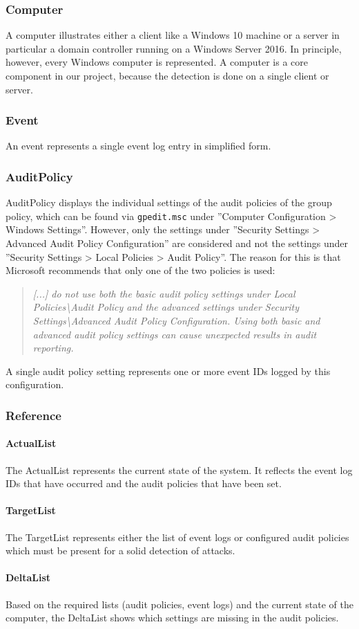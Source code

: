\subsubsection{Computer}
A computer illustrates either a client like a Windows 10 machine or a server in particular a domain controller running on a Windows Server 2016. In principle, however, every Windows computer is represented. A computer is a core component in our project, because the detection is done on a single client or server. 

\subsubsection{Event}
An event represents a single event log entry in simplified form.

\subsubsection{AuditPolicy}\label{DomainModelAuditPolicy}
AuditPolicy displays the individual settings of the audit policies of the group policy, which can be found via \lstinline|gpedit.msc| under ''Computer Configuration > Windows Settings''. However, only the settings under ''Security Settings > Advanced Audit Policy Configuration'' are considered and not the settings under ''Security Settings > Local Policies > Audit Policy''. The reason for this is that Microsoft recommends that only one of the two policies is used:
\begin{quotation}
    \textit{[...] do not use both the basic audit policy settings under Local Policies\textbackslash Audit Policy and the advanced settings under Security Settings\textbackslash Advanced Audit Policy Configuration. Using both basic and advanced audit policy settings can cause unexpected results in audit reporting.} \cite{AdvancedSecurityAuditing}
\end{quotation}
A single audit policy setting represents one or more event IDs logged by this configuration.

\subsubsection{Reference}
\paragraph{ActualList}
The ActualList represents the current state of the system. It reflects the event log IDs that have occurred and the audit policies that have been set.

\paragraph{TargetList}
The TargetList represents either the list of event logs or configured audit policies which must be present for a solid detection of attacks.

\paragraph{DeltaList}
Based on the required lists (audit policies, event logs) and the current state of the computer, the DeltaList shows which settings are missing in the audit policies.